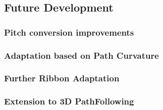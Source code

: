 \subsection{Future Development}

\subsubsection{Pitch conversion improvements}

\subsubsection{Adaptation based on Path Curvature}

\subsubsection{Further Ribbon Adaptation}


\subsubsection{Extension to 3D PathFollowing}





